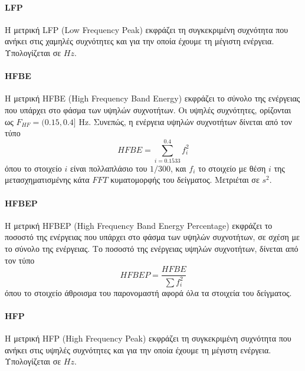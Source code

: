 \paragraph{LFP}
Η μετρική LFP (Low Frequency Peak) εκφράζει τη συγκεκριμένη συχνότητα που ανήκει στις χαμηλές συχνότητες και για την οποία έχουμε τη μέγιστη ενέργεια. Υπολογίζεται σε $Hz$.


\paragraph{HFBE}
Η μετρική HFBE (High Frequency Band Energy) εκφράζει το σύνολο της ενέργειας που υπάρχει στο φάσμα των υψηλών συχνοτήτων. Οι υψηλές συχνότητες, ορίζονται ως $F_{HF} = (0.15, 0.4]$ Hz. Συνεπώς, η ενέργεια υψηλών συχνοτήτων δίνεται από τον τύπο
\begin{equation}
\label{eq:hfbe}
   HFBE = \sum_{i=0.1533}^{0.4}f_i^2
\end{equation}
όπου το στοιχείο $i$ είναι πολλαπλάσιο του $1/300$, και $f_i$ το στοιχείο με θέση $i$ της μετασχηματισμένης κάτα $FFT$ κυματομορφής του δείγματος. Μετριέται σε $s^2$.

\paragraph{HFBEP}
Η μετρική HFBEP (High Frequency Band Energy Percentage) εκφράζει το ποσοστό της ενέργειας που υπάρχει στο φάσμα των υψηλών συχνοτήτων, σε σχέση με το σύνολο της ενέργειας. Το ποσοστό της ενέργειας υψηλών συχνοτήτων, δίνεται από τον τύπο
\begin{equation}
\label{eq:hfbep}
   HFBEP = \frac{HFBE}{\sum{f_i^2}}
\end{equation}
όπου το στοιχείο άθροισμα του παρονομαστή αφορά όλα τα στοιχεία του δείγματος.

\paragraph{HFP}
Η μετρική HFP (High Frequency Peak) εκφράζει τη συγκεκριμένη συχνότητα που ανήκει στις υψηλές συχνότητες και για την οποία έχουμε τη μέγιστη ενέργεια. Υπολογίζεται σε $Hz$.

